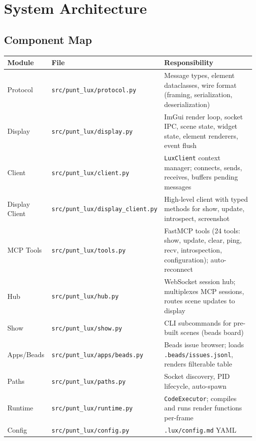 \documentclass[a4paper,10pt]{article}
\newcommand{\modpath}[1]{\texttt{src/punt\_lux/#1}}
\begin{document}
\section{System Architecture}

\subsection{Component Map}

\begin{center}
\begin{tabular}{llp{7cm}}
\toprule
\textbf{Module} & \textbf{File} & \textbf{Responsibility} \\
\midrule
Protocol    & \modpath{protocol.py}  & Message types, element dataclasses,
              wire format (framing, serialization, deserialization) \\
Display     & \modpath{display.py}   & ImGui render loop, socket IPC,
              scene state, widget state, element renderers, event flush \\
Client      & \modpath{client.py}    & \texttt{LuxClient} context manager;
              connects, sends, receives, buffers pending messages \\
Display Client & \modpath{display\_client.py} & High-level client with
              typed methods for show, update, introspect, screenshot \\
MCP Tools   & \modpath{tools.py}     & FastMCP tools (24 tools: show,
              update, clear, ping, recv, introspection, configuration);
              auto-reconnect \\
Hub         & \modpath{hub.py}       & WebSocket session hub; multiplexes
              MCP sessions, routes scene updates to display \\
Show        & \modpath{show.py}      & CLI subcommands for pre-built
              scenes (beads board) \\
Apps/Beads  & \modpath{apps/beads.py} & Beads issue browser; loads
              \texttt{.beads/issues.jsonl}, renders filterable table \\
Paths       & \modpath{paths.py}     & Socket discovery, PID lifecycle,
              auto-spawn \\
Runtime     & \modpath{runtime.py}   & \texttt{CodeExecutor}; compiles
              and runs render functions per-frame \\
Config      & \modpath{config.py}    & \texttt{.lux/config.md} YAML

\end{tabular}
\end{center}
\end{document}
